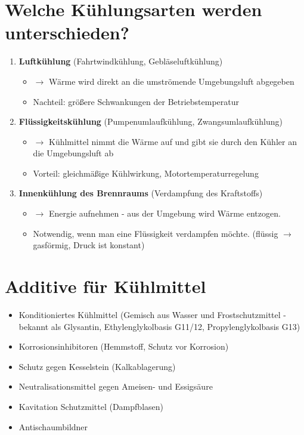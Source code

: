 \section{Welche Kühlungsarten werden
unterschieden?}\label{welche-kuehlungsarten-werden-unterschieden}

\begin{enumerate}
\item
  \textbf{Luftkühlung} (Fahrtwindkühlung, Gebläseluftkühlung)

  \begin{itemize}
  \item
    $\to$ Wärme wird direkt an die umströmende Umgebungsluft abgegeben
  \item
    Nachteil: größere Schwankungen der Betriebstemperatur
  \end{itemize}
\item
  \textbf{Flüssigkeitskühlung} (Pumpenumlaufkühlung,
  Zwangsumlaufkühlung)

  \begin{itemize}
  \item
    $\to$ Kühlmittel nimmt die Wärme auf und gibt sie durch den Kühler
    an die Umgebungsluft ab
  \item
    Vorteil: gleichmäßige Kühlwirkung, Motortemperaturregelung
  \end{itemize}
\item
  \textbf{Innenkühlung des Brennraums} (Verdampfung des Kraftstoffs)

  \begin{itemize}
  \item
    $\to$ Energie aufnehmen - aus der Umgebung wird Wärme entzogen.
  \item
    Notwendig, wenn man eine Flüssigkeit verdampfen möchte. (flüssig
    $\to$ gasförmig, Druck ist konstant)
  \end{itemize}
\end{enumerate}

\section{Additive für Kühlmittel}\label{additive-fuer-kuehlmittel}

\begin{itemize}
\item
  Konditioniertes Kühlmittel (Gemisch aus Wasser und Frostschutzmittel -
  bekannt als Glysantin, Ethylenglykolbasis G11/12, Propylenglykolbasis
  G13)
\item
  Korrosionsinhibitoren (Hemmstoff, Schutz vor Korrosion)
\item
  Schutz gegen Kesselstein (Kalkablagerung)
\item
  Neutralisationsmittel gegen Ameisen- und Essigsäure
\item
  Kavitation Schutzmittel (Dampfblasen)
\item
  Antischaumbildner
\end{itemize}

